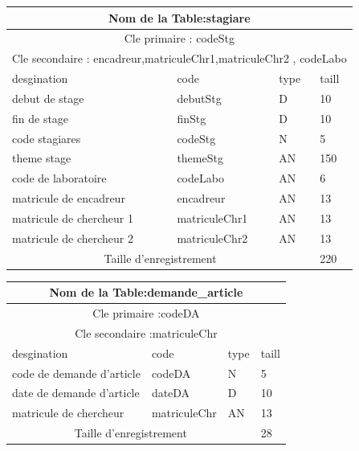 \vspace{2cm}

\begin{tabular}{ |p{5cm}||p{4cm}|p{3cm}|p{3cm}|  }
    \hline
    \multicolumn{4}{|c|}{Nom de la Table:stagiare } \\
    \hline
    \multicolumn{4}{|c|}{Cle primaire : codeStg} \\
    \hline
    \multicolumn{4}{|c|}{Cle secondaire :  encadreur,matriculeChr1,matriculeChr2 , codeLabo} \\
    \hline
    \hline
    desgination&code&type&taill \\
    \hline
    debut de stage&debutStg&D&10 \\
    fin de stage&finStg&D&10 \\
    code stagiares&codeStg&N&5 \\
    theme stage&themeStg&AN&150 \\
    code de laboratoire&codeLabo&AN&6 \\
    matricule de encadreur&encadreur&AN&13 \\
    matricule de chercheur 1&matriculeChr1&AN&13 \\
    matricule de chercheur 2&matriculeChr2&AN&13 \\
    \hline
    \hline
    \multicolumn{3}{|c|}{Taille d’enregistrement} & 220\\
    \hline
\end{tabular}

\vspace{2cm}

\begin{tabular}{ |p{5cm}||p{4cm}|p{3cm}|p{3cm}|  }
    \hline
    \multicolumn{4}{|c|}{Nom de la Table:demande\_article } \\
    \hline
    \multicolumn{4}{|c|}{Cle primaire :codeDA } \\
    \hline
    \multicolumn{4}{|c|}{Cle secondaire :matriculeChr  } \\
    \hline
    \hline
    desgination&code&type&taill \\
    \hline
    code de demande d'article&codeDA&N&5 \\
    date de demande d'article&dateDA&D&10 \\
    matricule de chercheur&matriculeChr&AN&13 \\
    \hline
    \hline
    \multicolumn{3}{|c|}{Taille d’enregistrement} & 28\\
    \hline
\end{tabular}

